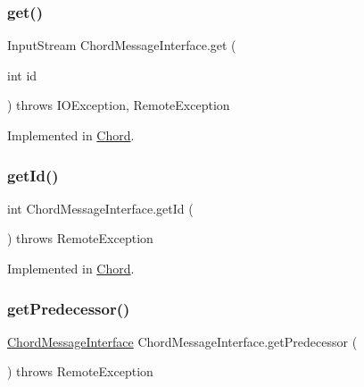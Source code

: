 \subsubsection{\texorpdfstring{get()}{get()}}
{\footnotesize\ttfamily Input\+Stream Chord\+Message\+Interface.\+get (\begin{DoxyParamCaption}\item[{int}]{id }\end{DoxyParamCaption}) throws I\+O\+Exception, Remote\+Exception}



Implemented in \hyperlink{class_chord_a0425685114bc996226e87f417221c213}{Chord}.

\hypertarget{interface_chord_message_interface_acead95d9a7196f05b656462ab78138eb}{}\label{interface_chord_message_interface_acead95d9a7196f05b656462ab78138eb} 
\subsubsection{\texorpdfstring{get\+Id()}{getId()}}
{\footnotesize\ttfamily int Chord\+Message\+Interface.\+get\+Id (\begin{DoxyParamCaption}{ }\end{DoxyParamCaption}) throws Remote\+Exception}



Implemented in \hyperlink{class_chord_a7c6a50aff653bafc040f923c93061bdb}{Chord}.

\hypertarget{interface_chord_message_interface_ab07c08ba6088ef880eaf4ebae8281c51}{}\label{interface_chord_message_interface_ab07c08ba6088ef880eaf4ebae8281c51} 
\subsubsection{\texorpdfstring{get\+Predecessor()}{getPredecessor()}}
{\footnotesize\ttfamily \hyperlink{interface_chord_message_interface}{Chord\+Message\+Interface} Chord\+Message\+Interface.\+get\+Predecessor (\begin{DoxyParamCaption}{ }\end{DoxyParamCaption}) throws Remote\+Exception}



